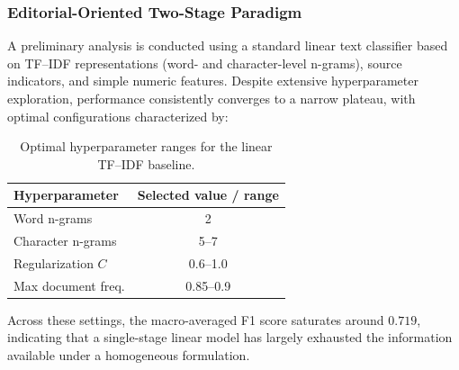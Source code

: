 
\subsubsection{Editorial-Oriented Two-Stage Paradigm}

A preliminary analysis is conducted using a standard linear text classifier based on TF--IDF representations (word- and character-level n-grams), source indicators, and simple numeric features. Despite extensive hyperparameter exploration, performance consistently converges to a narrow plateau, with optimal configurations characterized by:
\begin{table}[H]
\centering
\caption{Optimal hyperparameter ranges for the linear TF--IDF baseline.}
\label{tab:baseline_hyperparams}
\begin{tabular}{lc}
\hline
\textbf{Hyperparameter} & \textbf{Selected value / range} \\
\hline
Word n-grams        & 2 \\
Character n-grams   & 5--7 \\
Regularization $C$  & 0.6--1.0 \\
Max document freq.  & 0.85--0.9 \\
\hline
\end{tabular}
\end{table}


Across these settings, the macro-averaged F1 score saturates around $0.719$, indicating that a single-stage linear model has largely exhausted the information available under a homogeneous formulation.

\begin{table}[H]
\centering
\caption{Examples of high-support editorial tokens with near-zero conditional entropy.}
\label{tab:low_entropy_tokens}
\small
{}
\end{table}

